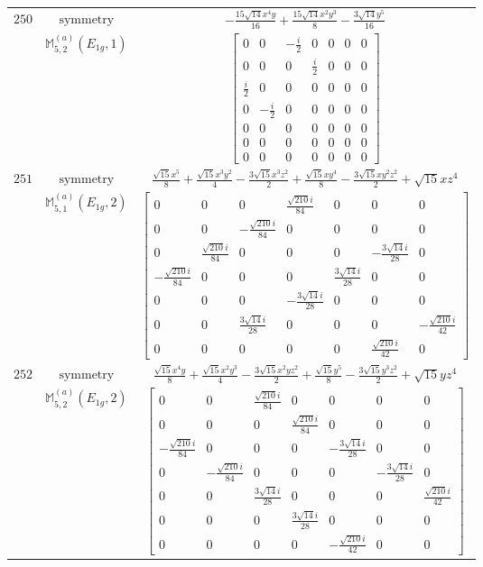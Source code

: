 \documentclass[fleqn,8pt,landscape]{jsarticle}
\begin{document}
\begin{longtable}{ccc}
$ 250 $ & $ \text{symmetry} $ & $ - \frac{15 \sqrt{14} x^{4} y}{16} + \frac{15 \sqrt{14} x^{2} y^{3}}{8} - \frac{3 \sqrt{14} y^{5}}{16} $ \\
$  $ & $ \mathbb{M}_{5,2}^{(a)}(E_{1g},1) $ & $ \begin{bmatrix} 0 & 0 & - \frac{i}{2} & 0 & 0 & 0 & 0 \\ 0 & 0 & 0 & \frac{i}{2} & 0 & 0 & 0 \\ \frac{i}{2} & 0 & 0 & 0 & 0 & 0 & 0 \\ 0 & - \frac{i}{2} & 0 & 0 & 0 & 0 & 0 \\ 0 & 0 & 0 & 0 & 0 & 0 & 0 \\ 0 & 0 & 0 & 0 & 0 & 0 & 0 \\ 0 & 0 & 0 & 0 & 0 & 0 & 0 \end{bmatrix} $ \\ \hline
$ 251 $ & $ \text{symmetry} $ & $ \frac{\sqrt{15} x^{5}}{8} + \frac{\sqrt{15} x^{3} y^{2}}{4} - \frac{3 \sqrt{15} x^{3} z^{2}}{2} + \frac{\sqrt{15} x y^{4}}{8} - \frac{3 \sqrt{15} x y^{2} z^{2}}{2} + \sqrt{15} x z^{4} $ \\
$  $ & $ \mathbb{M}_{5,1}^{(a)}(E_{1g},2) $ & $ \begin{bmatrix} 0 & 0 & 0 & \frac{\sqrt{210} i}{84} & 0 & 0 & 0 \\ 0 & 0 & - \frac{\sqrt{210} i}{84} & 0 & 0 & 0 & 0 \\ 0 & \frac{\sqrt{210} i}{84} & 0 & 0 & 0 & - \frac{3 \sqrt{14} i}{28} & 0 \\ - \frac{\sqrt{210} i}{84} & 0 & 0 & 0 & \frac{3 \sqrt{14} i}{28} & 0 & 0 \\ 0 & 0 & 0 & - \frac{3 \sqrt{14} i}{28} & 0 & 0 & 0 \\ 0 & 0 & \frac{3 \sqrt{14} i}{28} & 0 & 0 & 0 & - \frac{\sqrt{210} i}{42} \\ 0 & 0 & 0 & 0 & 0 & \frac{\sqrt{210} i}{42} & 0 \end{bmatrix} $ \\ \hline
$ 252 $ & $ \text{symmetry} $ & $ \frac{\sqrt{15} x^{4} y}{8} + \frac{\sqrt{15} x^{2} y^{3}}{4} - \frac{3 \sqrt{15} x^{2} y z^{2}}{2} + \frac{\sqrt{15} y^{5}}{8} - \frac{3 \sqrt{15} y^{3} z^{2}}{2} + \sqrt{15} y z^{4} $ \\
$  $ & $ \mathbb{M}_{5,2}^{(a)}(E_{1g},2) $ & $ \begin{bmatrix} 0 & 0 & \frac{\sqrt{210} i}{84} & 0 & 0 & 0 & 0 \\ 0 & 0 & 0 & \frac{\sqrt{210} i}{84} & 0 & 0 & 0 \\ - \frac{\sqrt{210} i}{84} & 0 & 0 & 0 & - \frac{3 \sqrt{14} i}{28} & 0 & 0 \\ 0 & - \frac{\sqrt{210} i}{84} & 0 & 0 & 0 & - \frac{3 \sqrt{14} i}{28} & 0 \\ 0 & 0 & \frac{3 \sqrt{14} i}{28} & 0 & 0 & 0 & \frac{\sqrt{210} i}{42} \\ 0 & 0 & 0 & \frac{3 \sqrt{14} i}{28} & 0 & 0 & 0 \\ 0 & 0 & 0 & 0 & - \frac{\sqrt{210} i}{42} & 0 & 0 \end{bmatrix} $ \\ \hline

\end{longtable}
\end{document}
